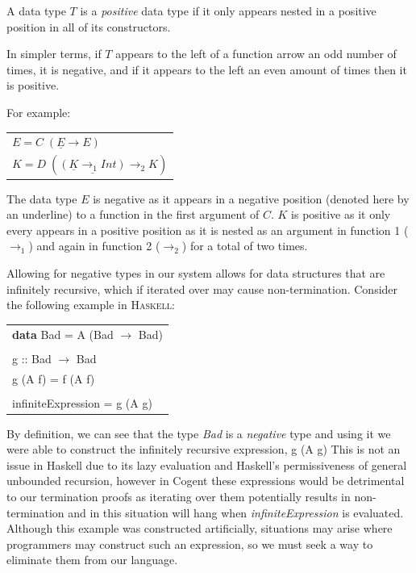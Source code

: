\theoremstyle{definition}
\begin{definition}
    A data type $T$ is a \textit{positive} data type if it only appears nested in a positive position
    in all of its constructors.
\end{definition}

In simpler terms, if $T$ appears to the left of a function arrow an odd number of times, it is negative,
and if it appears to the left an even amount of times then it is positive.

For example:

\begin{center}
    \begin{tabular}{l}
        $E = C\; (\underline{E} \rightarrow E)$ \\
        $K = D\; (\underline{(\underline{K} \rightarrow_1 Int)} \rightarrow_2 K)$
    \end{tabular} 
\end{center}

The data type $E$ is negative as it appears in a negative position (denoted here by an underline)
to a function in the first argument of $C$.
$K$ is positive as it only every appears in a positive position as it is nested as an argument
in function 1 ($\rightarrow_1$) and again in function 2 ($\rightarrow_2$) for a total of two times.

Allowing for negative types in our system allows for data structures that are infinitely recursive,
which if iterated over may cause non-termination. Consider the following example in \textsc{Haskell}:

\begin{center}
    \begin{tabular}{l}
            \textbf{data} \textsf{Bad = A (Bad $\rightarrow$ Bad)} \\ \\

            \textsf{g :: Bad $\rightarrow$ Bad} \\
            \textsf{g (A f) = f (A f)} \\ \\

            \textsf{infiniteExpression = g (A g)}
    \end{tabular} 
\end{center}

By definition, we can see that the type \textit{Bad} is a \textit{negative} type and using it we were able
to construct the infinitely recursive expression, \textsf{g (A g)}
This is not an issue in Haskell due to its lazy evaluation and  Haskell's permissiveness of general unbounded recursion,
however in Cogent these expressions would be detrimental to our termination
proofs as iterating over them potentially results in non-termination and in this
situation will hang when \textit{infiniteExpression} is evaluated.
Although this example was constructed artificially, situations may arise where
programmers may construct such an expression, so we must seek a way to
eliminate them from our language.

